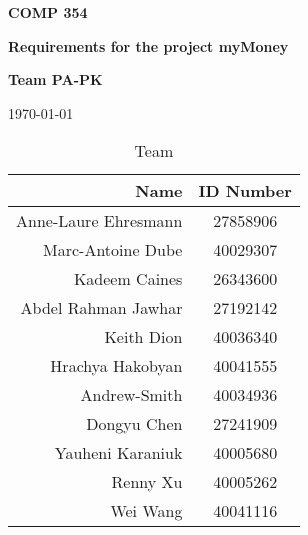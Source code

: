 \documentclass[11pt]{article}
\begin{document}
                \vspace*{0.5in}
                \centerline{\bf\Large COMP 354}
                \centerline{\bf\Large Requirements for the project myMoney}

                \vspace*{0.5in}
                \centerline{\bf\Large Team PA-PK}

                \vspace*{0.5in}
                \centerline{\today}

                \vspace*{1.5in}
                \begin{table}[htbp]
                    \caption{Team}
                    \begin{center}
                        \begin{tabular}{|r | c|}
                            \hline
                            Name & ID Number \\
                            \hline\hline
                            Anne-Laure Ehresmann & 27858906 \\
                            \hline
                            Marc-Antoine Dube & 40029307 \\
                            \hline
                            Kadeem Caines & 26343600 \\
                            \hline
                            Abdel Rahman Jawhar & 27192142 \\
                            \hline
                            Keith Dion & 40036340 \\
                            \hline
                            Hrachya Hakobyan & 40041555 \\
                            \hline
                            Andrew-Smith & 40034936 \\
                            \hline
                            Dongyu Chen & 27241909 \\
                            \hline
                            Yauheni Karaniuk & 40005680 \\
                            \hline
                            Renny Xu & 40005262\\
                            \hline
                            Wei Wang & 40041116 \\
                            \hline
                        \end{tabular}
                    \end{center}
                \end{table}
\end{document}
